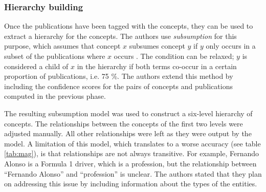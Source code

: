 \subsubsection{Hierarchy building} \label{mag_hierarchy_building}

Once the publications have been tagged with the concepts, they can be used to extract a hierarchy for the concepts. The authors use \textit{subsumption} for this purpose, which assumes that concept $x$ subsumes concept $y$ if $y$ only occurs in a subset of the publications where $x$ occurs \cite{sanderson1999deriving}. The condition can be relaxed; $y$ is considered a child of $x$ in the hierarchy if both terms co-occur in a certain proportion of publications, i.e. 75 \%. The authors extend this method by including the confidence scores for the pairs of concepts and publications computed in the previous phase.

The resulting subsumption model was used to construct a six-level hierarchy of concepts. The relationships between the concepts of the first two levels were adjusted manually. All other relationships were left as they were output by the model. A limitation of this model, which translates to a worse accuracy (see table \ref{tab:mag}), is that relationships are not always transitive. For example, Fernando Alonso is a Formula 1 driver, which is a profession, but the relationship between ``Fernando Alonso'' and ``profession'' is unclear. The authors stated that they plan on addressing this issue by including information about the types of the entities.